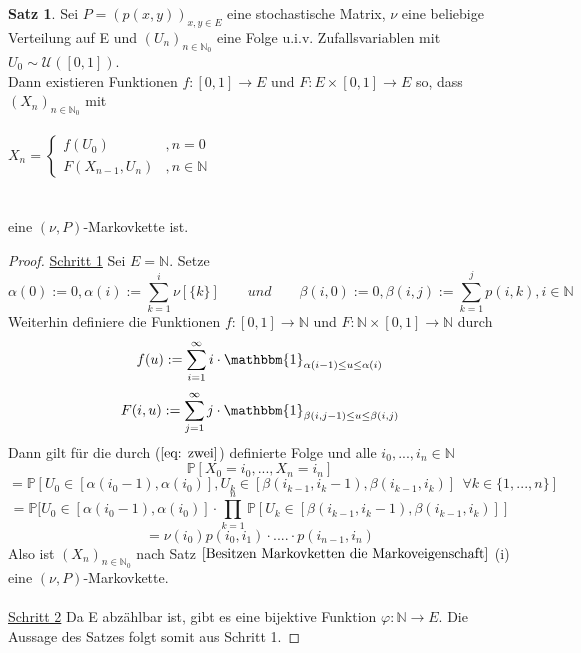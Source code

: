 \documentclass[a4paper,12pt]{scrartcl}
\theoremstyle{definition}
\newtheorem{sat}{Satz}[section]
\begin{document}
\label{Existenz von Funktionen von Markovketten}
\begin{sat}
Sei $P = (p(x,y))_{x,y \in E}$ eine stochastische Matrix, $\nu$ eine beliebige Verteilung auf E und $(U_{n})_{n \in \mathbb{N}_{0}}$ eine Folge u.i.v. Zufallsvariablen mit $U_{0} \sim \mathcal{U}([0,1])$.
\\
Dann existieren Funktionen $f:[0,1] \to E$ und $F:E \times [0,1] \to E$ so, dass $(X_{n})_{n \in \mathbb{N}_{0}}$ mit
\\
\\
$X_{n}=
\begin{cases}
f(U_{0})  &  , n=0  \\
F(X_{n-1},U_{n})  & , n \in \mathbb{N}
\end{cases}$
\\
\\
\\
eine $(\nu,P)$-Markovkette ist.
\end{sat}
\begin{proof}
\underline{Schritt 1} Sei $E = \mathbb{N}$. Setze
\\
\begin{equation}
\label{eq: zwei}
\alpha(0) := 0, \alpha(i) := \sum_{k=1}^{i} \nu[\lbrace k \rbrace] \qquad und \qquad \beta(i,0) := 0, \beta(i,j) := \sum_{k=1}^{j} p(i,k) , i \in \mathbb{N}
\end{equation}
Weiterhin definiere die Funktionen $f:[0,1] \to \mathbb{N}$ und $F:\mathbb{N} \times [0,1] \to \mathbb{N}$ durch
\begin{equation*}
f(u) := \sum_{i=1}^{\infty} i \cdot \mathbbm{1}_{\alpha(i-1)\leq u \leq \alpha(i) }
\end{equation*}
\begin{equation*}
F(i,u) := \sum_{j=1}^{\infty} j \cdot \mathbbm{1}_{\beta(i,j-1)\leq u \leq \beta(i,j) }
\end{equation*}
Dann gilt für die durch ($\ref{eq: zwei}$) definierte Folge und alle $i_{0},...,i_{n} \in \mathbb{N}$
\begin{equation*}
\mathbb{P}[X_{0} = i_{0},...,X_{n} = i_{n}]
\end{equation*}
\begin{equation*}
= \mathbb{P}[U_{0} \in [\alpha(i_{0} - 1),\alpha(i_{0})], U_{k} \in [\beta(i_{k-1},i_{k} -1),\beta(i_{k-1},i_{k})] \: \: \forall k  \in \lbrace 1,...,n \rbrace ]
\end{equation*}
\begin{equation*}
\stackrel{}{=} \mathbb{P}[U_{0} \in [\alpha(i_{0} - 1),\alpha(i_{0})] \cdot \prod_{k=1}^{n} \mathbb{P}[ U_{k} \in [\beta(i_{k-1},i_{k} -1),\beta(i_{k-1},i_{k})]]
\end{equation*}
\begin{equation*}
= \nu(i_{0})p(i_{0},i_{1}) \cdot .... \cdot p(i_{n-1},i_{n})   
\end{equation*}
Also ist $(X_{n})_{n \in \mathbb{N}_{0}}$ nach Satz $\ref{Besitzen Markovketten die Markoveigenschaft}$ (i) eine $(\nu,P)$-Markovkette.
\\
\\
\underline{Schritt 2} Da E abzählbar ist, gibt es eine bijektive Funktion $\varphi: \mathbb{N} \to E$. Die Aussage des Satzes folgt somit aus Schritt 1. 
\end{proof}
\end{document}
